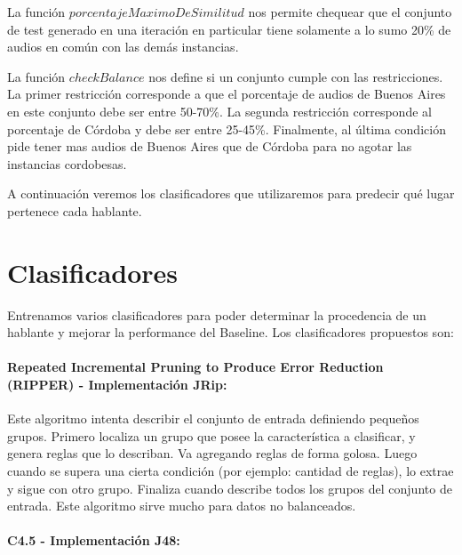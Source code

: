 La función $porcentajeMaximoDeSimilitud$ nos permite chequear que el conjunto de test generado en una iteración en particular tiene solamente a lo sumo 20\% de audios en común con las demás instancias.

La función $checkBalance$ nos define si un conjunto cumple con las restricciones. La primer restricción corresponde a que el porcentaje de audios de Buenos Aires en este conjunto debe ser entre 50-70\%. La segunda restricción corresponde al porcentaje de Córdoba y debe ser entre 25-45\%. Finalmente, al última condición pide tener mas audios de Buenos Aires que de Córdoba para no agotar las instancias cordobesas.

A continuación veremos los clasificadores que utilizaremos para predecir qué lugar pertenece cada hablante.

\section{Clasificadores}

Entrenamos varios clasificadores para poder determinar la procedencia de un hablante y mejorar la performance del Baseline. Los clasificadores propuestos son: 

\paragraph{Repeated Incremental Pruning to Produce Error Reduction (RIPPER) \cite{Cohen1995} - Implementación JRip:}


Este algoritmo intenta describir el conjunto de entrada definiendo pequeños grupos. Primero localiza un grupo que posee la característica a clasificar, y genera reglas que lo describan. Va agregando reglas de forma golosa. Luego cuando se supera una cierta condición (por ejemplo: cantidad de reglas), lo extrae y sigue con otro grupo. Finaliza cuando describe todos los grupos del conjunto de entrada. Este algoritmo sirve mucho para datos no balanceados.

\paragraph{C4.5 \cite{Quinlan1993} - Implementación J48:}

